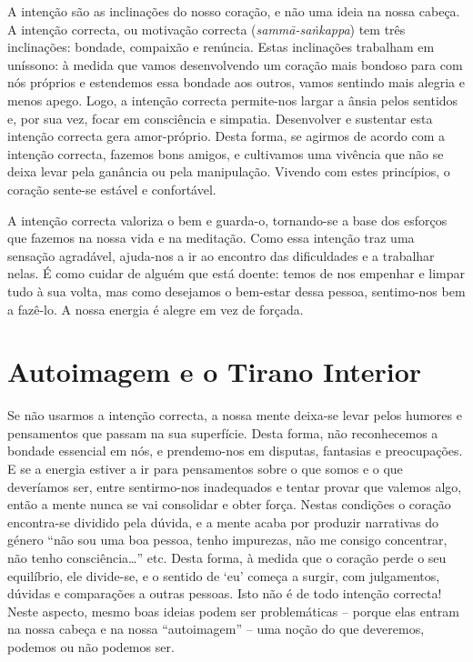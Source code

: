 A intenção são as inclinações do nosso coração, e não uma ideia na nossa
cabeça. A intenção correcta, ou motivação correcta
(\emph{sammā-saṅkappa}) tem três inclinações: bondade, compaixão e
renúncia. Estas inclinações trabalham em uníssono: à medida que vamos
desenvolvendo um coração mais bondoso para com nós próprios e estendemos
essa bondade aos outros, vamos sentindo mais alegria e menos apego.
Logo, a intenção correcta permite-nos largar a ânsia pelos sentidos e,
por sua vez, focar em consciência e simpatia. Desenvolver e sustentar
esta intenção correcta gera amor-próprio. Desta forma, se agirmos de
acordo com a intenção correcta, fazemos bons amigos, e cultivamos uma
vivência que não se deixa levar pela ganância ou pela manipulação.
Vivendo com estes princípios, o coração sente-se estável e confortável.

A intenção correcta valoriza o bem e guarda-o, tornando-se a base dos
esforços que fazemos na nossa vida e na meditação. Como essa intenção
traz uma sensação agradável, ajuda-nos a ir ao encontro das dificuldades
e a trabalhar nelas. É como cuidar de alguém que está doente: temos de
nos empenhar e limpar tudo à sua volta, mas como desejamos o bem-estar
dessa pessoa, sentimo-nos bem a fazê-lo. A nossa energia é alegre em vez
de forçada.

\section{Autoimagem e o Tirano Interior}

Se não usarmos a intenção correcta, a nossa mente deixa-se levar pelos
humores e pensamentos que passam na sua superfície. Desta forma, não
reconhecemos a bondade essencial em nós, e prendemo-nos em disputas,
fantasias e preocupações. E se a energia estiver a ir para pensamentos
sobre o que somos e o que deveríamos ser, entre sentirmo-nos inadequados
e tentar provar que valemos algo, então a mente nunca se vai consolidar
e obter força. Nestas condições o coração encontra-se dividido pela
dúvida, e a mente acaba por produzir narrativas do género “não sou uma
boa pessoa, tenho impurezas, não me consigo concentrar, não tenho
consciência\ldots{}” etc. Desta forma, à medida que o coração perde o seu
equilíbrio, ele divide-se, e o sentido de `eu' começa a surgir, com
julgamentos, dúvidas e comparações a outras pessoas. Isto não é de todo
intenção correcta! Neste aspecto, mesmo boas ideias podem ser
problemáticas -- porque elas entram na nossa cabeça e na nossa
“autoimagem” -- uma noção do que deveremos, podemos ou não podemos ser.

